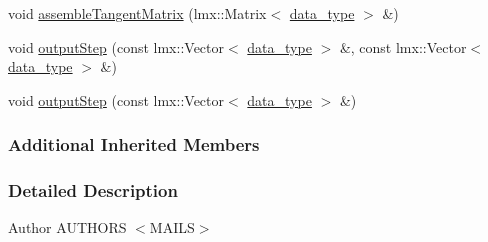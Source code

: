 \begin{DoxyCompactItemize}
\item 
void \hyperlink{classmknix_1_1_flex_global_galerkin_ab5ddc03826dcf8dea98fd53093b2dfe7}{assemble\-Tangent\-Matrix} (lmx\-::\-Matrix$<$ \hyperlink{namespacemknix_a16be4b246fbf2cceb141e3a179111020}{data\-\_\-type} $>$ \&)
\item 
void \hyperlink{classmknix_1_1_flex_global_galerkin_a031a130b73e3fe0fc862393f94d235cb}{output\-Step} (const lmx\-::\-Vector$<$ \hyperlink{namespacemknix_a16be4b246fbf2cceb141e3a179111020}{data\-\_\-type} $>$ \&, const lmx\-::\-Vector$<$ \hyperlink{namespacemknix_a16be4b246fbf2cceb141e3a179111020}{data\-\_\-type} $>$ \&)
\item 
void \hyperlink{classmknix_1_1_flex_global_galerkin_a1882efa0a8f8c8832f6116b8f7874d2a}{output\-Step} (const lmx\-::\-Vector$<$ \hyperlink{namespacemknix_a16be4b246fbf2cceb141e3a179111020}{data\-\_\-type} $>$ \&)
\end{DoxyCompactItemize}
\subsubsection*{Additional Inherited Members}


\subsubsection{Detailed Description}
\begin{DoxyAuthor}{Author}
A\-U\-T\-H\-O\-R\-S $<$\-M\-A\-I\-L\-S$>$ 
\end{DoxyAuthor}


